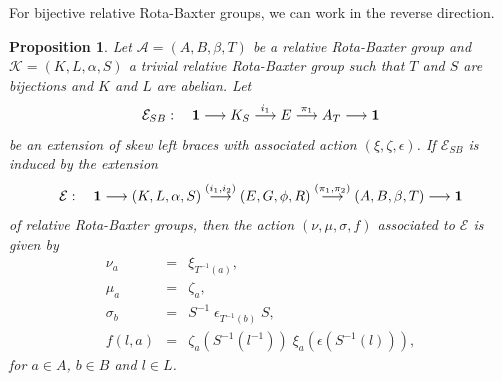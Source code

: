 \documentclass[11pt]{amsart}
\theoremstyle{thrm}
\theoremstyle{plain}
\newtheorem{prop}[thm]{Proposition}
\theoremstyle{definition}
\numberwithin{equation}{section}
\begin{document}
For bijective relative Rota-Baxter groups, we can work in the reverse direction.

\begin{prop}\label{actnprop}
Let  $\mathcal{A}=(A, B, \beta, T)$ be a  relative Rota-Baxter group and $\mathcal{K}=(K, L, \alpha, S)$ a trivial relative Rota-Baxter group such that $T$ and $S$ are bijections and $K$ and $L$ are abelian.
 Let
\begin{equation}\label{extension of SLB for action}
\mathcal{E}_{SB}: \quad {\bf 1} \longrightarrow K_{S} \stackrel{i_1}{\longrightarrow}  E \stackrel{\pi_1}{\longrightarrow} A_{T} \longrightarrow {\bf 1}
\end{equation}
be an extension of skew left braces with associated action $(\xi, \zeta, \epsilon)$. If $\mathcal{E}_{SB}$ is induced by the extension 
\begin{equation}\label{extension of RRB for action}
\mathcal{E} : \quad {\bf 1} \longrightarrow (K,L,\alpha,S ) \stackrel{(i_1, i_2)}{\longrightarrow}  (E,G, \phi, R) \stackrel{(\pi_1, \pi_2)}{\longrightarrow} (A,B, \beta, T) \longrightarrow {\bf 1}
\end{equation}
of relative  Rota-Baxter groups, then the action $(\nu, \mu, \sigma, f)$ associated to $\mathcal{E}$ is given by 
\begin{eqnarray}
\nu_a  &=& \xi_{T^{-1}(a)}, \label{RRB2sbactn2}\\
\mu_a &=& \zeta_a, \label{RRB2sbactn1}\\
\sigma_b &=& S^{-1} \; \epsilon_{T^{-1}(b)} \; S, \label{RRB2sbactn3}\\
f(l,a) &=&  \zeta_a(S^{-1}(l^{-1})) \; \xi_a(\epsilon(S^{-1}(l))), \label{RRB2sbactn4}
\end{eqnarray}
for $a \in A$, $b \in B$ and $l \in L$.
\end{prop}
\end{document}
